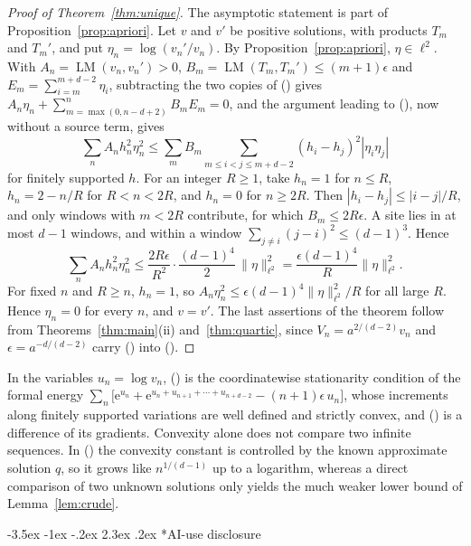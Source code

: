 \documentclass[twoside,10pt]{article}
\makeatletter
\numberwithin{equation}{section}
\theoremstyle{slbody}
\theoremstyle{remark}
\newcommand{\e}{\mathrm e}
\renewcommand{\section}{%
  \@startsection{section}{1}{\z@}%
    {-3.5ex \@plus -1ex \@minus -.2ex}%
    {2.3ex \@plus .2ex}%
    {\normalfont\large\bfseries}}
\renewcommand{\eqref}[1]{%
  \textup{{\normalfont(\oldstylenums{\ref{#1}}}\normalfont)}}
\makeatother
\begin{document}
\begin{proof}[Proof of Theorem~\ref{thm:unique}]
The asymptotic statement is part of Proposition~\ref{prop:apriori}.  Let
\(v\) and \(v'\) be positive solutions, with products \(T_m\) and
\(T_m'\), and put \(\eta_n=\log(v_n'/v_n)\).  By
Proposition~\ref{prop:apriori}, \(\eta\in\ell^2\).  With
\(A_n=\operatorname{LM}(v_n,v_n')>0\),
\(B_m=\operatorname{LM}(T_m,T_m')\leq(m+1)\epsilon\) and
\(E_m=\sum_{i=m}^{m+d-2}\eta_i\), subtracting the two copies of
\eqref{eq:integrated} gives
\(A_n\eta_n+\sum_{m=\max(0,n-d+2)}^{n}B_mE_m=0\), and the argument
leading to \eqref{eq:localized}, now without a source term, gives
\[
\sum_nA_nh_n^2\eta_n^2
\leq\sum_mB_m\sum_{m\leq i<j\leq m+d-2}(h_i-h_j)^2|\eta_i\eta_j|
\]
for finitely supported \(h\).  For an integer \(R\geq1\), take
\(h_n=1\) for \(n\leq R\),
\(h_n=2-n/R\) for \(R<n<2R\), and \(h_n=0\) for \(n\geq2R\).  Then
\(|h_i-h_j|\leq|i-j|/R\), and only windows with \(m<2R\) contribute, for
which \(B_m\leq2R\epsilon\).  A site lies in at most \(d-1\) windows, and
within a window \(\sum_{j\neq i}(j-i)^2\leq(d-1)^3\).  Hence
\[
\sum_nA_nh_n^2\eta_n^2
\leq\frac{2R\epsilon}{R^2}\cdot\frac{(d-1)^4}{2}\,\|\eta\|_{\ell^2}^2
=\frac{\epsilon(d-1)^4}{R}\|\eta\|_{\ell^2}^2 .
\]
For fixed \(n\) and \(R\geq n\), \(h_n=1\), so
\(A_n\eta_n^2\leq\epsilon(d-1)^4\|\eta\|_{\ell^2}^2/R\) for all large
\(R\).  Hence \(\eta_n=0\) for every \(n\), and \(v=v'\).  The last
assertions of the theorem follow from Theorems~\ref{thm:main}(ii)
and~\ref{thm:quartic}, since \(V_n=a^{2/(d-2)}v_n\) and
\(\epsilon=a^{-d/(d-2)}\) carry \eqref{eq:FH-recurrence} into
\eqref{eq:general-recurrence}.
\end{proof}

In the variables \(u_n=\log v_n\), \eqref{eq:integrated} is the
coordinatewise stationarity condition of the formal energy
\(\sum_n\bigl[\e^{u_n}+\e^{u_n+u_{n+1}+\cdots+u_{n+d-2}}-(n+1)\epsilon\,u_n\bigr]\),
whose increments along finitely supported variations are well defined
and strictly convex, and \eqref{eq:linearized} is a difference of its
gradients.  Convexity alone does not compare two infinite sequences.
In \eqref{eq:log-means} the convexity constant is controlled by the
known approximate solution \(q\), so it grows like \(n^{1/(d-1)}\) up to
a logarithm, whereas a direct comparison of two unknown solutions only
yields the much weaker lower bound of Lemma~\ref{lem:crude}.

\section*{AI-use disclosure}
\end{document}
